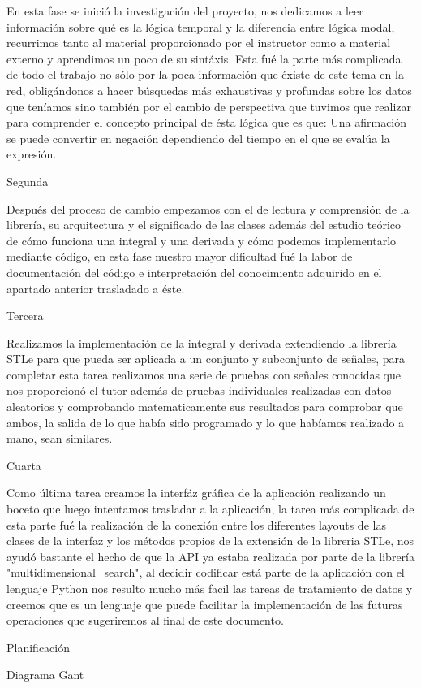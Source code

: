 	En esta fase se inició la investigación del proyecto, nos dedicamos a leer información sobre qué es la lógica temporal y la diferencia entre lógica modal, recurrimos tanto al material proporcionado por el instructor como a material externo y aprendimos un poco de su sintáxis. Esta fué la parte más complicada de todo el trabajo no sólo por la poca información que éxiste de este tema en la red, obligándonos a hacer búsquedas más exhaustivas y profundas sobre los datos que teníamos sino también por el cambio de perspectiva que tuvimos que realizar para comprender el concepto principal de ésta lógica que es que: Una afirmación se puede convertir en negación dependiendo del tiempo en el que se evalúa la expresión. 
	
Segunda

	Después del proceso de cambio empezamos con el de lectura y comprensión de la librería, su arquitectura y el significado de las clases además del estudio teórico de cómo funciona una integral y una derivada y cómo podemos implementarlo mediante código, en esta fase nuestro mayor dificultad fué la labor de documentación del código e interpretación del conocimiento adquirido en el apartado anterior trasladado a éste. 

Tercera
	
	Realizamos la implementación de la integral y derivada extendiendo la librería STLe para que pueda ser aplicada a un conjunto y subconjunto de señales, para completar esta tarea realizamos una serie de pruebas con señales conocidas que nos proporcionó el tutor además de pruebas individuales realizadas con datos aleatorios y comprobando matematicamente sus resultados para comprobar que ambos, la salida de lo que había sido programado y lo que habíamos realizado a mano, sean similares.

Cuarta 

	Como última tarea creamos la interfáz gráfica de la aplicación realizando un boceto que luego intentamos trasladar a la aplicación, la tarea más complicada de esta parte fué la realización de la conexión entre los diferentes layouts de las clases de la interfaz y los métodos propios de la extensión de la libreria STLe, nos ayudó bastante el hecho de que la API ya estaba realizada por parte de la librería "multidimensional\_search", al decidir codificar está parte de la aplicación con el lenguaje Python nos resulto mucho más facil las tareas de tratamiento de datos y creemos que es un lenguaje que puede facilitar la implementación de las futuras operaciones que sugeriremos al final de este documento. 


Planificación 


Diagrama Gant